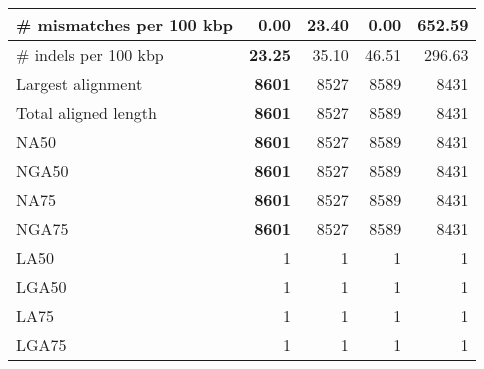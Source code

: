 \documentclass[12pt,a4paper]{article}
\begin{document}
\begin{table}[ht]
\begin{center}
\begin{tabular}{|l*{4}{|r}|}
\# mismatches per 100 kbp & {\bf 0.00} & 23.40 & {\bf 0.00} & 652.59 \\ \hline
\# indels per 100 kbp & {\bf 23.25} & 35.10 & 46.51 & 296.63 \\ \hline
Largest alignment & {\bf 8601} & 8527 & 8589 & 8431 \\ \hline
Total aligned length & {\bf 8601} & 8527 & 8589 & 8431 \\ \hline
NA50 & {\bf 8601} & 8527 & 8589 & 8431 \\ \hline
NGA50 & {\bf 8601} & 8527 & 8589 & 8431 \\ \hline
NA75 & {\bf 8601} & 8527 & 8589 & 8431 \\ \hline
NGA75 & {\bf 8601} & 8527 & 8589 & 8431 \\ \hline
LA50 & 1 & 1 & 1 & 1 \\ \hline
LGA50 & 1 & 1 & 1 & 1 \\ \hline
LA75 & 1 & 1 & 1 & 1 \\ \hline
LGA75 & 1 & 1 & 1 & 1 \\ \hline
\end{tabular}
\end{center}
\end{table}
\end{document}
